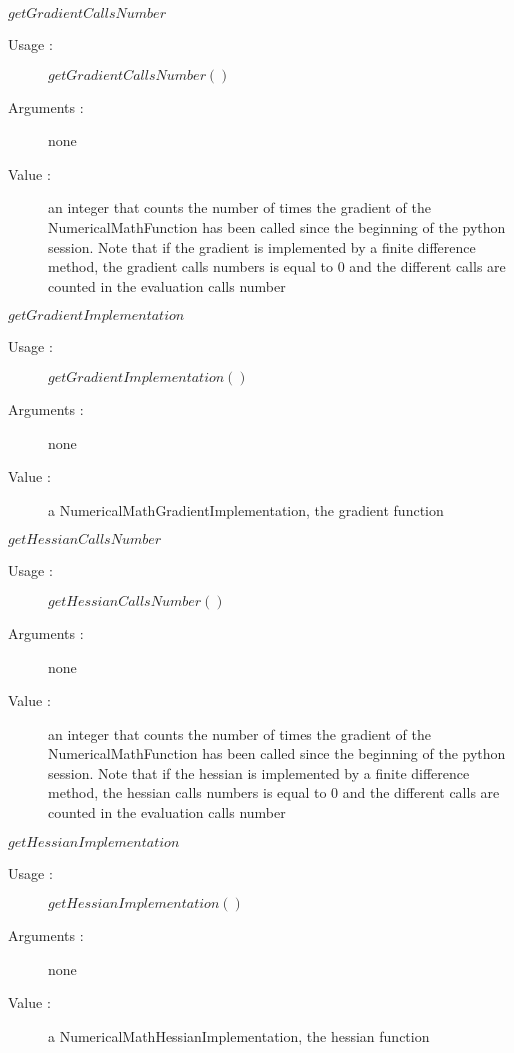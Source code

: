 \begin{description}
\begin{description}
  \item $getGradientCallsNumber$
    \begin{description}
    \item[Usage :] $getGradientCallsNumber()$
    \item[Arguments :] none
    \item[Value :] an integer that counts the number of times the gradient of the NumericalMathFunction has been called since the beginning of the python session. Note that if the gradient is implemented by a finite difference method, the gradient calls numbers is equal to 0 and the different calls are counted in the evaluation calls number
    \end{description}
    \bigskip

  \item $getGradientImplementation$
    \begin{description}
    \item[Usage :] $getGradientImplementation()$
    \item[Arguments :] none
    \item[Value :] a NumericalMathGradientImplementation, the gradient function
    \end{description}
    \bigskip

  \item $getHessianCallsNumber$
    \begin{description}
    \item[Usage :] $getHessianCallsNumber()$
    \item[Arguments :] none
    \item[Value :] an integer that counts the number of times the gradient of the NumericalMathFunction has been called since the beginning of the python session. Note that if the hessian is implemented by a finite difference method, the hessian calls numbers is equal to 0 and the different calls are counted in the evaluation calls number
    \end{description}
    \bigskip

  \item $getHessianImplementation$
    \begin{description}
    \item[Usage :] $getHessianImplementation()$
    \item[Arguments :] none
    \item[Value :] a NumericalMathHessianImplementation, the hessian function
    \end{description}
    \bigskip


\end{description}
\end{description}
